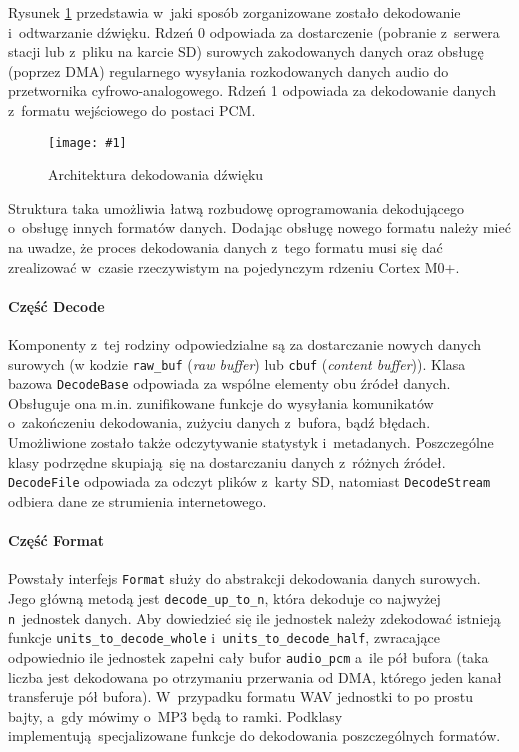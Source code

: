\documentclass[polish]{aghengthesis}
\newcommand{\imgint}[4]{
	\begin{figure}[{#4}]
		\centering
		\texttt{[image: \#1]}
		\caption{#2}
		\label{#1}
	\end{figure}
}
\newcommand{\imgh}[3]{\imgint{#1}{#2}{#3}{H}}
\begin{document}
			Rysunek \ref{3/PicoRadio-sound-decoding} przedstawia w~jaki sposób zorganizowane zostało dekodowanie i~odtwarzanie dźwięku.
			Rdzeń 0 odpowiada za dostarczenie (pobranie z~serwera stacji lub z~pliku na karcie SD) surowych zakodowanych danych oraz obsługę (poprzez DMA) regularnego wysyłania rozkodowanych danych audio do przetwornika cyfrowo-analogowego.
			Rdzeń 1 odpowiada za dekodowanie danych z~formatu wejściowego do postaci PCM.
			\imgh{3/PicoRadio-sound-decoding}{Architektura dekodowania dźwięku}{0.95}
			
			Struktura taka umożliwia łatwą rozbudowę oprogramowania dekodującego o~obsługę innych formatów danych. Dodając obsługę nowego formatu należy mieć na uwadze, że proces dekodowania danych z~tego formatu musi się dać zrealizować w~czasie rzeczywistym na pojedynczym rdzeniu Cortex M0+.
			
		
			\paragraph{Część Decode}
				Komponenty z~tej rodziny odpowiedzialne są za dostarczanie nowych danych surowych (w kodzie \lstinline|raw_buf| (\textit{raw buffer}) lub \lstinline|cbuf| (\textit{content buffer})). Klasa bazowa \lstinline|DecodeBase| odpowiada za wspólne elementy obu źródeł danych. Obsługuje ona m.in. zunifikowane funkcje do wysyłania komunikatów o~zakończeniu dekodowania, zużyciu danych z~bufora, bądź błędach. Umożliwione zostało także odczytywanie statystyk i~metadanych. Poszczególne klasy podrzędne skupiają się na dostarczaniu danych z~różnych źródeł. \lstinline|DecodeFile| odpowiada za odczyt plików z~karty SD, natomiast \lstinline|DecodeStream| odbiera dane ze strumienia internetowego.
			
			\paragraph{Część Format}
				Powstały interfejs \lstinline|Format| służy do abstrakcji dekodowania danych surowych. Jego główną metodą jest \lstinline|decode_up_to_n|, która dekoduje co najwyżej \lstinline|n|~jednostek danych. Aby dowiedzieć się ile jednostek należy zdekodować istnieją funkcje \lstinline|units_to_decode_whole| i~\lstinline|units_to_decode_half|, zwracające odpowiednio ile jednostek zapełni cały bufor \lstinline|audio_pcm| a~ile pół bufora (taka liczba jest dekodowana po otrzymaniu przerwania od DMA, którego jeden kanał transferuje pół bufora). W~przypadku formatu WAV jednostki to po prostu bajty, a~gdy mówimy o~MP3 będą to ramki. Podklasy implementują specjalizowane funkcje do dekodowania poszczególnych formatów.
			
\end{document}

